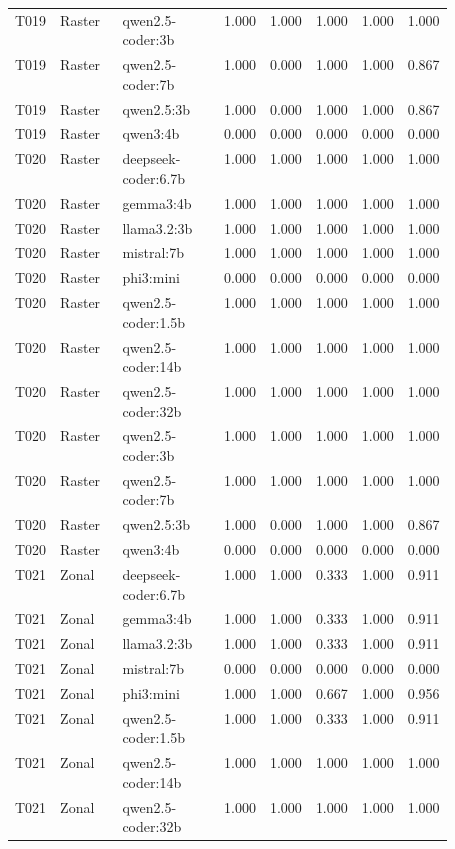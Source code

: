 \begin{longtable}{p{0.08\linewidth}p{0.16\linewidth}p{0.27\linewidth}rrrrr}
T019 & Raster & qwen2.5-coder:3b & 1.000 & 1.000 & 1.000 & 1.000 & 1.000 \\
T019 & Raster & qwen2.5-coder:7b & 1.000 & 0.000 & 1.000 & 1.000 & 0.867 \\
T019 & Raster & qwen2.5:3b & 1.000 & 0.000 & 1.000 & 1.000 & 0.867 \\
T019 & Raster & qwen3:4b & 0.000 & 0.000 & 0.000 & 0.000 & 0.000 \\
T020 & Raster & deepseek-coder:6.7b & 1.000 & 1.000 & 1.000 & 1.000 & 1.000 \\
T020 & Raster & gemma3:4b & 1.000 & 1.000 & 1.000 & 1.000 & 1.000 \\
T020 & Raster & llama3.2:3b & 1.000 & 1.000 & 1.000 & 1.000 & 1.000 \\
T020 & Raster & mistral:7b & 1.000 & 1.000 & 1.000 & 1.000 & 1.000 \\
T020 & Raster & phi3:mini & 0.000 & 0.000 & 0.000 & 0.000 & 0.000 \\
T020 & Raster & qwen2.5-coder:1.5b & 1.000 & 1.000 & 1.000 & 1.000 & 1.000 \\
T020 & Raster & qwen2.5-coder:14b & 1.000 & 1.000 & 1.000 & 1.000 & 1.000 \\
T020 & Raster & qwen2.5-coder:32b & 1.000 & 1.000 & 1.000 & 1.000 & 1.000 \\
T020 & Raster & qwen2.5-coder:3b & 1.000 & 1.000 & 1.000 & 1.000 & 1.000 \\
T020 & Raster & qwen2.5-coder:7b & 1.000 & 1.000 & 1.000 & 1.000 & 1.000 \\
T020 & Raster & qwen2.5:3b & 1.000 & 0.000 & 1.000 & 1.000 & 0.867 \\
T020 & Raster & qwen3:4b & 0.000 & 0.000 & 0.000 & 0.000 & 0.000 \\
T021 & Zonal & deepseek-coder:6.7b & 1.000 & 1.000 & 0.333 & 1.000 & 0.911 \\
T021 & Zonal & gemma3:4b & 1.000 & 1.000 & 0.333 & 1.000 & 0.911 \\
T021 & Zonal & llama3.2:3b & 1.000 & 1.000 & 0.333 & 1.000 & 0.911 \\
T021 & Zonal & mistral:7b & 0.000 & 0.000 & 0.000 & 0.000 & 0.000 \\
T021 & Zonal & phi3:mini & 1.000 & 1.000 & 0.667 & 1.000 & 0.956 \\
T021 & Zonal & qwen2.5-coder:1.5b & 1.000 & 1.000 & 0.333 & 1.000 & 0.911 \\
T021 & Zonal & qwen2.5-coder:14b & 1.000 & 1.000 & 1.000 & 1.000 & 1.000 \\
T021 & Zonal & qwen2.5-coder:32b & 1.000 & 1.000 & 1.000 & 1.000 & 1.000 \\

\end{longtable}
